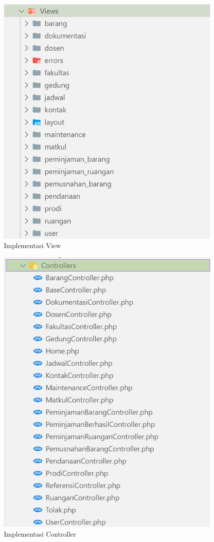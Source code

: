 \begin{figure}
	\centering
	\includegraphics[width=0.82\linewidth]{konten//gambar/implementasi-folder/folder-view.png}
	\caption{Implementasi View}
	\label{fig:implementasi-view}
\end{figure}

\begin{figure}
	\centering
	\includegraphics[width=0.82\linewidth]{konten//gambar/implementasi-folder/folder-controller.png}
	\caption{Implementasi Controller}
	\label{fig:implementasi-controller}
\end{figure}

